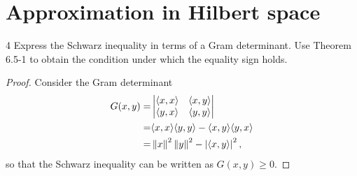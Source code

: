 \section{Approximation in Hilbert space}


\begin{exercise}{4}
Express the Schwarz inequality in terms of a Gram determinant.
Use Theorem 6.5-1 to obtain the condition under which the equality sign holds.
\end{exercise}
\begin{proof}
Consider the Gram determinant
\begin{align*}
    G(x, y)
    =& \begin{vmatrix}
        \langle x,x\rangle & \langle x,y\rangle\\
        \langle y,x\rangle & \langle y,y\rangle
    \end{vmatrix}\\
    =& \langle x, x\rangle\langle y,y\rangle - \langle x, y\rangle\langle y, x\rangle\\
    =& \left\lVert x\right\rVert^2\left\lVert y\right\rVert^2 - \left\lvert \langle x, y\rangle\right\rvert^2,
\end{align*}
so that the Schwarz inequality can be written as $G(x,y) \geq 0$.
\end{proof} 
